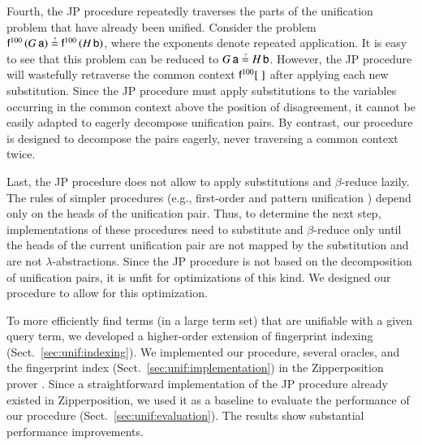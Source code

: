 Fourth, the JP procedure repeatedly traverses the parts of the unification
problem that have already been unified. Consider the problem $\cst{f}^{100} \,
(G \, \cst{a}) \unif \cst{f}^{100} \, (H \, \cst{b})$, where the exponents
denote repeated application. It is easy to see that this problem can be reduced
to $G \, \cst{a} \unif H \, \cst{b}$. However, the JP procedure will wastefully
retraverse the common context $ \mathsf{f}^{100} [\;] $ after applying each new
substitution. Since the JP procedure must apply substitutions to the variables occurring in the
common context above the position of disagreement, it cannot be easily adapted to
eagerly decompose unification pairs. By contrast, our procedure is designed to decompose
the pairs eagerly, never traversing a common context twice.

Last, the JP procedure does not allow to apply substitutions and
$\beta$-reduce lazily.
The rules of simpler procedures (e.g., first-order
\cite{hv-09-unifalgs} and pattern unification \cite{tn-93-patterns}) depend only on
the heads of the unification pair.
Thus, to
determine the next step, implementations of these procedures need to
substitute and
$\beta$-reduce only until the heads of the current unification
pair are not mapped by the substitution and are not $\lambda$-abstractions. 
Since the JP procedure is not based on the decomposition of unification pairs, 
it is unfit for
optimizations of this kind.
We designed our procedure to allow for this optimization.

To more efficiently find terms (in a large term set) that are unifiable with a given query term,
we developed a higher-order extension of fingerprint indexing \cite{ss-12-fp-indexing}
(Sect.~\ref{sec:unif:indexing}).
We implemented our procedure, several oracles,
and the fingerprint index (Sect.~\ref{sec:unif:implementation}) in
the Zipperposition prover \cite{sc-supind-17,sc-15-simon-phd}. Since a
straightforward implementation of the JP procedure already existed in
Zipperposition, we used it as a baseline to evaluate the performance of our
procedure (Sect.~\ref{sec:unif:evaluation}). The results show substantial
performance improvements.



